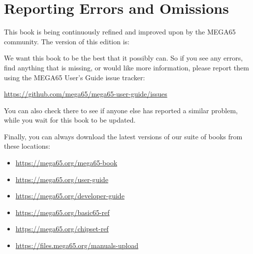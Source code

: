 \chapter*{Reporting Errors and Omissions}

This book is being continuously refined and improved upon by the MEGA65 community.
The version of this edition is:



We want this book to be the best that it possibly can. So if you see any errors,
find anything that is missing, or would like more information,
please report them using the MEGA65 User's Guide issue tracker:

\url{https://github.com/mega65/mega65-user-guide/issues}

You can also check there to see if anyone else has reported a similar problem,
while you wait for this book to be updated.

Finally, you can always download the latest versions of our suite of books from these locations:

\begin{itemize}
\item \url{https://mega65.org/mega65-book}
\item \url{https://mega65.org/user-guide}
\item \url{https://mega65.org/developer-guide}
\item \url{https://mega65.org/basic65-ref}
\item \url{https://mega65.org/chipset-ref}
\item \url{https://files.mega65.org/manuals-upload}
\end{itemize}
